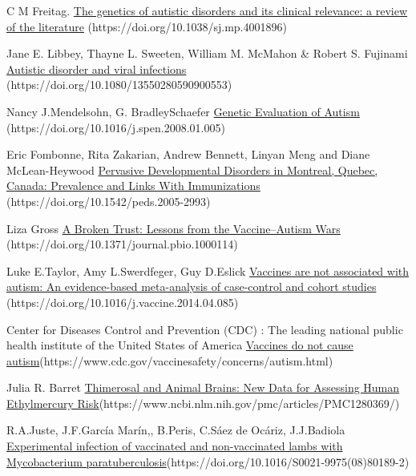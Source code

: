 \documentclass[10pt]{article}
\begin{document}
\begin{thebibliography}{9}

C M Freitag.
\href{https://doi.org/10.1038/sj.mp.4001896}{The genetics of autistic disorders and its clinical relevance: a review of the literature} (https://doi.org/10.1038/sj.mp.4001896)

Jane E. Libbey, Thayne L. Sweeten, William M. McMahon \& Robert S. Fujinami
\href{https://doi.org/10.1080/13550280590900553}{Autistic disorder and viral infections} (https://doi.org/10.1080/13550280590900553)

Nancy J.Mendelsohn, G. BradleySchaefer
\href{https://doi.org/10.1016/j.spen.2008.01.005}{Genetic Evaluation of Autism} (https://doi.org/10.1016/j.spen.2008.01.005)

Eric Fombonne, Rita Zakarian, Andrew Bennett, Linyan Meng and Diane McLean-Heywood
\href{https://doi.org/10.1542/peds.2005-2993}{Pervasive Developmental Disorders in Montreal, Quebec, Canada: Prevalence and Links With Immunizations} (https://doi.org/10.1542/peds.2005-2993)

Liza Gross
\href{https://doi.org/10.1371/journal.pbio.1000114}{A Broken Trust: Lessons from the Vaccine–Autism Wars} (https://doi.org/10.1371/journal.pbio.1000114)

Luke E.Taylor, Amy L.Swerdfeger, Guy D.Eslick
\href{https://doi.org/10.1016/j.vaccine.2014.04.085}{Vaccines are not associated with autism: An evidence-based meta-analysis of case-control and cohort studies} (https://doi.org/10.1016/j.vaccine.2014.04.085)

Center for Diseases Control and Prevention (CDC) : The leading national public health institute of the United States of America
\href{https://www.cdc.gov/vaccinesafety/concerns/autism.html}{Vaccines do not cause autism}(https://www.cdc.gov/vaccinesafety/concerns/autism.html)

Julia R. Barret
\href{https://www.ncbi.nlm.nih.gov/pmc/articles/PMC1280369/}{Thimerosal and Animal Brains: New Data for Assessing Human Ethylmercury Risk}(https://www.ncbi.nlm.nih.gov/pmc/articles/PMC1280369/)

R.A.Juste, J.F.García Marín,, B.Peris, C.Sáez de Ocáriz, J.J.Badiola
\href{https://doi.org/10.1016/S0021-9975(08)80189-2}{Experimental infection of vaccinated and non-vaccinated lambs with Mycobacterium paratuberculosis}(https://doi.org/10.1016/S0021-9975(08)80189-2)


\end{thebibliography}
\end{document}
